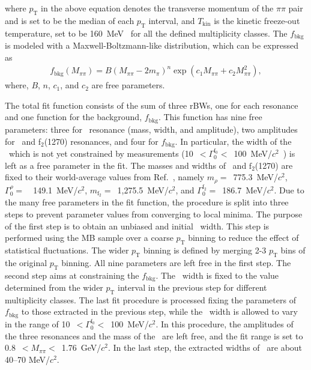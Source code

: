 where $p_{\mathrm{T}}$ in the above equation denotes the transverse momentum of the $\pi\pi$ pair and is set to be the median of each $p_{\mathrm{T}}$ interval, and $T_{\mathrm{kin}}$ is the kinetic freeze-out temperature, set to be 160~MeV~\cite{ALICE:2018qdv} for all the defined multiplicity classes. The $f_{\mathrm{bkg}}$ is modeled with a Maxwell-Boltzmann-like distribution, which can be expressed as~\cite{OPAL:1998enc}
\begin{eqnarray}
f_{\mathrm{bkg}}(M_{\pi\pi}) = B(M_{\pi\pi}-2m_{\pi})^{n}\exp{(c_{1}M_{\pi\pi} + c_{2}M_{\pi\pi}^{2})},
\label{eq:bkg}
\end{eqnarray} 
where, $B$, $n$, $c_{1}$, and $c_{2}$ are free parameters. 

The total fit function consists of the sum of three rBWs, one for each resonance and one function for the background, $f_{\mathrm{bkg}}$. This function has nine free parameters: three for \fzero~resonance (mass, width, and amplitude), two amplitudes for \rhoz~and f$_{2}$(1270) resonances, and four for $f_{\mathrm{bkg}}$. In particular, the width of the \fzero~which is not yet constrained by measurements (10~$<\Gamma_{0}^{\mathrm{f}_{0}}<$~100~MeV/$c^{2}$~\cite{ParticleDataGroup:2022pth}) is left as a free parameter in the fit. The masses and widths of \rhoz~and $\mathrm{f}_{2}$(1270) are fixed to their world-average values from Ref.~\cite{ParticleDataGroup:2022pth}, namely $m_{\rho}=$~775.3~MeV/$c^{2}$, $\Gamma^{\rho}_{0}=$~~149.1~MeV/$c^{2}$, $m_{\mathrm{f}_{2}}=$~1,275.5~MeV/$c^{2}$, and $\Gamma^{\mathrm{f}_{2}}_{0}=$~186.7~MeV/$c^{2}$. Due to the many free parameters in the fit function, the procedure is split into three steps to prevent parameter values from converging to local minima. The purpose of the first step is to obtain an unbiased and initial \fzero~width. This step is performed using the MB sample over a coarse $p_{\mathrm{T}}$ binning to reduce the effect of statistical fluctuations. The wider $p_{\mathrm{T}}$ binning is defined by merging 2-3 $p_{\mathrm{T}}$ bins of the original $p_{\mathrm{T}}$ binning. All nine parameters are left free in the first step. The second step aims at constraining the $f_{\mathrm{bkg}}$. The \fzero~width is fixed to the value determined from the wider $p_{\mathrm{T}}$ interval in the previous step for different multiplicity classes. The last fit procedure is processed fixing the parameters of $f_{\mathrm{bkg}}$ to those extracted in the previous step, while the \fzero~width is allowed to vary in the range of 10~$<\Gamma_{0}^{\mathrm{f}_{0}}<$~100~MeV/$c^{2}$. In this procedure, the amplitudes of the three resonances and the mass of the \fzero~are left free, and the fit range is set to 0.8~$<M_{\pi\pi}<$~1.76~GeV/$c^{2}$. In the last step, the extracted widths of \fzero~are about 40--70 MeV/$c^{2}$.


